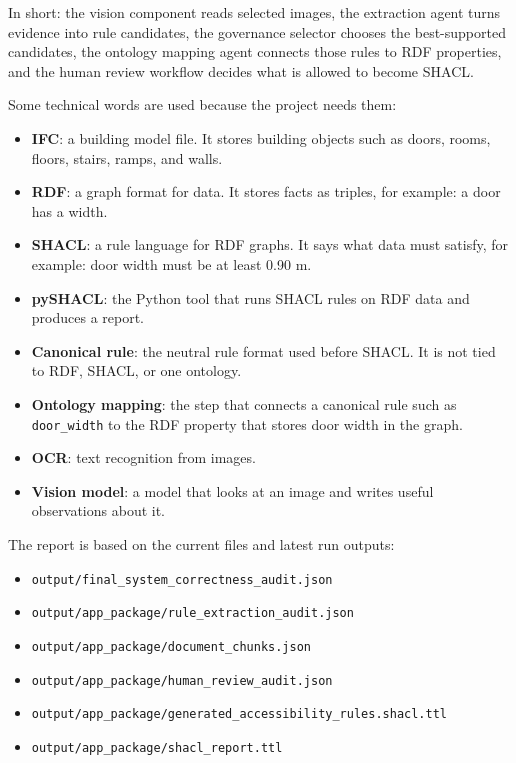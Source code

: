\documentclass[11pt,a4paper]{article}
\begin{document}
In short: the vision component reads selected images, the extraction agent turns evidence into rule candidates, the governance selector chooses the best-supported candidates, the ontology mapping agent connects those rules to RDF properties, and the human review workflow decides what is allowed to become SHACL.

Some technical words are used because the project needs them:

\begin{itemize}
  \item \textbf{IFC}: a building model file. It stores building objects such as doors, rooms, floors, stairs, ramps, and walls.
  \item \textbf{RDF}: a graph format for data. It stores facts as triples, for example: a door has a width.
  \item \textbf{SHACL}: a rule language for RDF graphs. It says what data must satisfy, for example: door width must be at least 0.90 m.
  \item \textbf{pySHACL}: the Python tool that runs SHACL rules on RDF data and produces a report.
  \item \textbf{Canonical rule}: the neutral rule format used before SHACL. It is not tied to RDF, SHACL, or one ontology.
  \item \textbf{Ontology mapping}: the step that connects a canonical rule such as \texttt{door\_width} to the RDF property that stores door width in the graph.
  \item \textbf{OCR}: text recognition from images.
  \item \textbf{Vision model}: a model that looks at an image and writes useful observations about it.
\end{itemize}

The report is based on the current files and latest run outputs:

\begin{itemize}
  \item \texttt{output/final\_system\_correctness\_audit.json}
  \item \texttt{output/app\_package/rule\_extraction\_audit.json}
  \item \texttt{output/app\_package/document\_chunks.json}
  \item \texttt{output/app\_package/human\_review\_audit.json}
  \item \texttt{output/app\_package/generated\_accessibility\_rules.shacl.ttl}
  \item \texttt{output/app\_package/shacl\_report.ttl}
\end{itemize}
\end{document}
